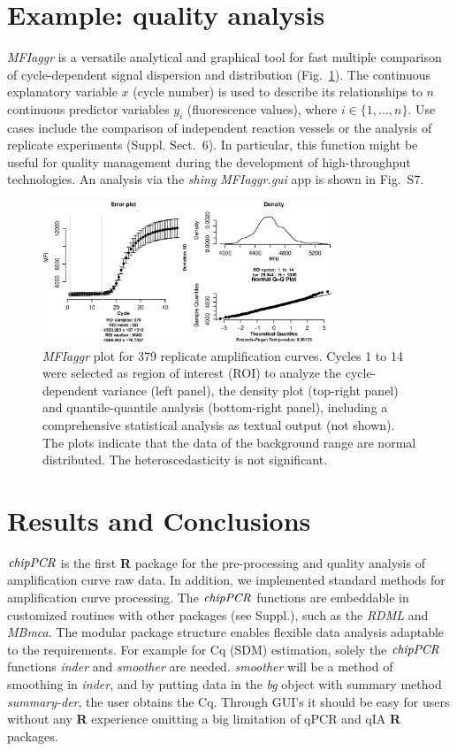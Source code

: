 \documentclass{bioinfo}
\begin{document}
\section{Example: quality analysis}

\textsl{MFIaggr} is a versatile analytical and graphical tool for fast multiple 
comparison of cycle-dependent signal dispersion and distribution 
(Fig.~\ref{fig:01}). The continuous explanatory variable $x$ (cycle number) is 
used to describe its relationships to $n$ continuous predictor variables $y_i$ 
(fluorescence values), where $i \in \{1, ..., n\}$. Use cases include the 
comparison of independent reaction vessels or the analysis of replicate 
experiments (Suppl. Sect.~6). In particular, this function might be useful for 
quality management during the development of high-throughput technologies. An 
analysis via the \emph{shiny} \textsl{MFIaggr.gui} app is shown in Fig.~S7.

\begin{figure}[!tpb]%
\centerline{\includegraphics[width=8.7cm]{fig01.eps}}
\caption{\textsl{MFIaggr} plot for 379 replicate amplification curves. Cycles 1 to 14 were 
selected as region of interest (ROI) to analyze the 
cycle-dependent variance (left panel), the density plot (top-right 
panel) and quantile-quantile analysis (bottom-right panel), including a 
comprehensive statistical analysis as textual output (not shown). The plots 
indicate that the data of the background range are normal 
distributed. The heteroscedasticity is not significant.}\label{fig:01}
\end{figure}
\section{Results and Conclusions}
$\emph{chipPCR}$ is the first \textbf{R} package for the pre-processing and 
quality analysis of amplification curve raw data. In addition, we implemented 
standard methods for amplification curve processing. The $\emph{chipPCR}$ 
functions are embeddable in customized routines with other packages (see 
Suppl.), such as the \emph{RDML} and \emph{MBmca}. The modular package 
structure enables flexible data analysis adaptable to the requirements. 
For example for Cq (SDM) estimation, solely the 
$\emph{chipPCR}$ functions \textsl{inder} and \textsl{smoother} are needed. 
\textsl{smoother} will be a method of smoothing in \textsl{inder}, and by 
putting data in the \textsl{bg} object with summary method \textsl{summary-der}, 
the user obtains the Cq. Through GUI's it should be easy for users without any 
\textbf{R} experience omitting a big limitation of qPCR and qIA \textbf{R} 
packages.
\end{document}
